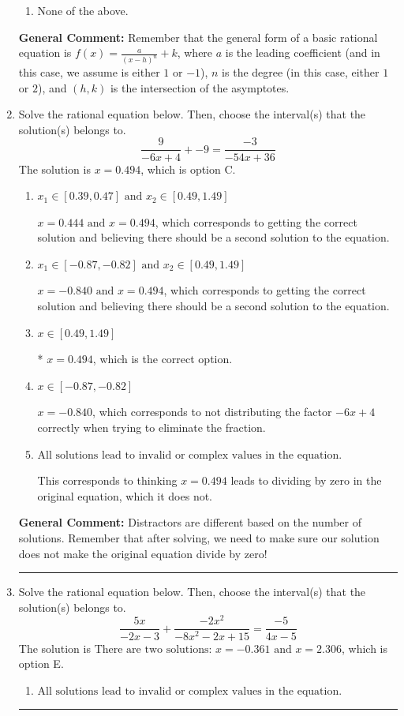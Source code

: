\documentclass{extbook}[14pt]
\newcommand{\litem}[1]{\item #1

\rule{\textwidth}{0.4pt}}
\begin{document}
\begin{enumerate}
{\begin{enumerate}[label=\Alph*.]
\begin{multicols}{2}
\end{multicols}\item None of the above.\end{enumerate}
\textbf{General Comment:} Remember that the general form of a basic rational equation is $ f(x) = \frac{a}{(x-h)^n} + k$, where $a$ is the leading coefficient (and in this case, we assume is either $1$ or $-1$), $n$ is the degree (in this case, either $1$ or $2$), and $(h, k)$ is the intersection of the asymptotes.
}
\litem{
Solve the rational equation below. Then, choose the interval(s) that the solution(s) belongs to.
\[ \frac{9}{-6x + 4} + -9 = \frac{-3}{-54x + 36} \]
The solution is \( x = 0.494 \), which is option C.\begin{enumerate}[label=\Alph*.]
\item \( x_1 \in [0.39, 0.47] \text{ and } x_2 \in [0.49,1.49] \)

$x = 0.444 \text{ and } x = 0.494$, which corresponds to getting the correct solution and believing there should be a second solution to the equation.
\item \( x_1 \in [-0.87, -0.82] \text{ and } x_2 \in [0.49,1.49] \)

$x = -0.840 \text{ and } x = 0.494$, which corresponds to getting the correct solution and believing there should be a second solution to the equation.
\item \( x \in [0.49,1.49] \)

* $x = 0.494$, which is the correct option.
\item \( x \in [-0.87,-0.82] \)

$x = -0.840$, which corresponds to not distributing the factor $-6x + 4$ correctly when trying to eliminate the fraction.
\item \( \text{All solutions lead to invalid or complex values in the equation.} \)

This corresponds to thinking $x = 0.494$ leads to dividing by zero in the original equation, which it does not.
\end{enumerate}

\textbf{General Comment:} Distractors are different based on the number of solutions. Remember that after solving, we need to make sure our solution does not make the original equation divide by zero!
}
\litem{
Solve the rational equation below. Then, choose the interval(s) that the solution(s) belongs to.
\[ \frac{5x}{-2x -3} + \frac{-2x^{2}}{-8x^{2} -2 x + 15} = \frac{-5}{4x -5} \]
The solution is \( \text{There are two solutions: } x = -0.361 \text{ and } x = 2.306 \), which is option E.\begin{enumerate}[label=\Alph*.]
\item \( \text{All solutions lead to invalid or complex values in the equation.} \)



\end{enumerate}}
\end{enumerate}
\end{document}
